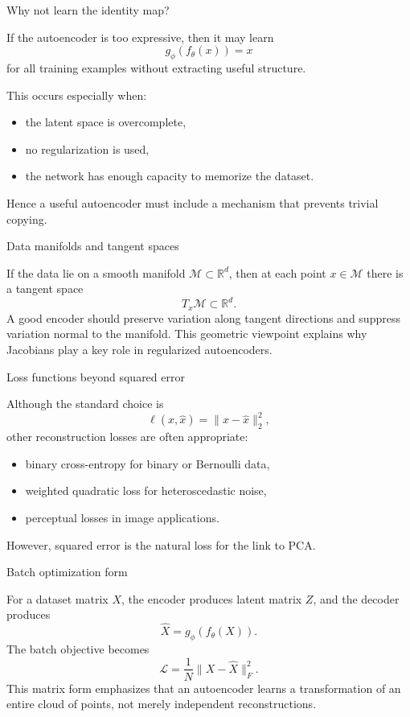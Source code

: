 \documentclass[aspectratio=169]{beamer}
\begin{document}
\begin{frame}{Why not learn the identity map?}

If the autoencoder is too expressive, then it may learn
\[
g_\phi(f_\theta(x)) = x
\]
for all training examples without extracting useful structure.

This occurs especially when:
\begin{itemize}
\item the latent space is overcomplete,
\item no regularization is used,
\item the network has enough capacity to memorize the dataset.
\end{itemize}

Hence a useful autoencoder must include a mechanism that prevents trivial copying.

\end{frame}

\begin{frame}{Data manifolds and tangent spaces}

If the data lie on a smooth manifold \(\mathcal{M}\subset \mathbb{R}^d\), then at each point \(x\in\mathcal{M}\) there is a tangent space
\[
T_x\mathcal{M}\subset \mathbb{R}^d.
\]
A good encoder should preserve variation along tangent directions and suppress variation normal to the manifold.
This geometric viewpoint explains why Jacobians play a key role in regularized autoencoders.

\end{frame}

\begin{frame}{Loss functions beyond squared error}

Although the standard choice is
\[
\ell(x,\hat x)=\|x-\hat x\|_2^2,
\]
other reconstruction losses are often appropriate:
\begin{itemize}
\item binary cross-entropy for binary or Bernoulli data,
\item weighted quadratic loss for heteroscedastic noise,
\item perceptual losses in image applications.
\end{itemize}
However, squared error is the natural loss for the link to PCA.

\end{frame}

\begin{frame}{Batch optimization form}

For a dataset matrix \(X\), the encoder produces latent matrix \(Z\), and the decoder produces
\[
\hat X = g_\phi(f_\theta(X)).
\]
The batch objective becomes
\[
\mathcal{L} = \frac{1}{N}\|X-\hat X\|_F^2.
\]
This matrix form emphasizes that an autoencoder learns a transformation of an entire cloud of points, not merely independent reconstructions.

\end{frame}
\end{document}
